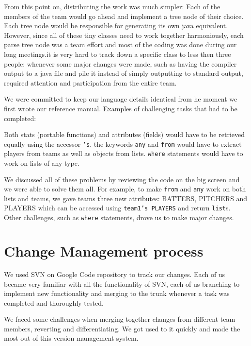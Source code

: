 From this point on, distributing the work was much simpler: Each of
the members of the team would go ahead and implement a tree node of
their choice. Each tree node would be responsible for generating its
own java equivalent. However, since all of these tiny classes need to
work together harmoniously, each parse tree node was a team effort and
most of the coding was done during our long meetings.it is very hard
to track down a specific class to less then three people: whenever
some major changes were made, such as having the compiler output to a
java file and pile it instead of simply outputting to standard output,
required attention and participation from the entire team.

We were committed to keep our language details identical from he
moment we first wrote our reference manual. Examples of challenging
tasks that had to be completed:

Both stats (portable functions) and attributes (fields) would have to
be retrieved equally using the accessor \texttt{'s}.  the keywords
\texttt{any} and \texttt{from} would have to extract players from
teams as well as objects from lists.  \texttt{where} statements would
have to work on lists of any type.

We discussed all of these problems by reviewing the code on the big
screen and we were able to solve them all. For example, to make
\texttt{from} and \texttt{any} work on both lists and teams, we gave
teams three new attributes: BATTERS, PITCHERS and PLAYERS which can be
accessed using \texttt{team1's PLAYERS} and return
\texttt{list}s. Other challenges, such as \texttt{where} statements,
drove us to make major changes.


\section{Change Management process}

We used SVN on Google Code repository to track our changes. Each of us
became very familiar with all the functionality of SVN, each of us
branching to implement new functionality and merging to the trunk
whenever a task was completed and thoroughly tested.

We faced some challenges when merging together changes from different
team members, reverting and differentiating. We got used to it quickly
and made the most out of this version management system.
